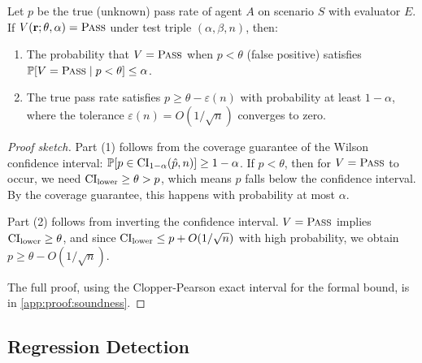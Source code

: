 \begin{theorem}
\label{thm:soundness}
Let $p$ be the true (unknown) pass rate of agent $A$ on scenario $S$
with evaluator $E$. If $V(\mathbf{r}; \theta, \alpha) = \textsc{Pass}$ under
test triple $(\alpha, \beta, n)$, then:
\begin{enumerate}[leftmargin=*]
  \item The probability that $V = \textsc{Pass}$ when $p < \theta$ (false
    positive) satisfies $\mathbb{P}[V = \textsc{Pass} \mid p < \theta] \leq \alpha$.
  \item The true pass rate satisfies $p \geq \theta - \varepsilon(n)$
    with probability at least $1 - \alpha$, where the tolerance
    $\varepsilon(n) = O(1/\sqrt{n})$ converges to zero.
\end{enumerate}
\end{theorem}

\begin{proof}[Proof sketch]
Part (1) follows from the coverage guarantee of the Wilson confidence
interval: $\mathbb{P}[p \in \mathrm{CI}_{1-\alpha}(\hat{p}, n)] \geq 1 - \alpha$. If
$p < \theta$, then for $V = \textsc{Pass}$ to occur, we need
$\mathrm{CI}_{\text{lower}} \geq \theta > p$, which means $p$ falls below the
confidence interval. By the coverage guarantee, this happens with
probability at most $\alpha$.

Part (2) follows from inverting the confidence interval.
$V = \textsc{Pass}$ implies $\mathrm{CI}_{\text{lower}} \geq \theta$, and since
$\mathrm{CI}_{\text{lower}} \leq p + O(1/\sqrt{n})$ with high probability, we
obtain $p \geq \theta - O(1/\sqrt{n})$.

The full proof, using the Clopper-Pearson exact interval for the formal
bound, is in \cref{app:proof:soundness}.
\end{proof}

\subsection{Regression Detection}
\label{sec:stochastic:regression}


